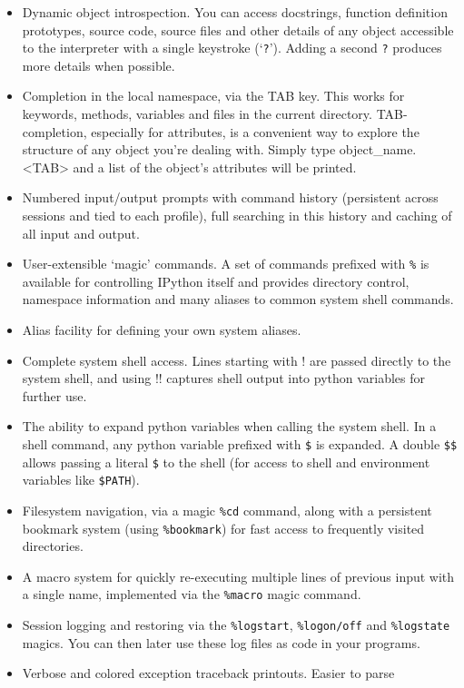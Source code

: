 \begin{itemize}
\item Dynamic object introspection. You can access docstrings, function
definition prototypes, source code, source files and other details
of any object accessible to the interpreter with a single keystroke
(`\texttt{?}'). Adding a second \texttt{?} produces more details when
possible.
\item Completion in the local namespace, via the TAB key. This works for
keywords, methods, variables and files in the current directory. TAB-completion,
especially for attributes, is a convenient way to explore the structure
of any object you're dealing with. Simply type object\_name.<TAB>
and a list of the object's attributes will be printed.
\item Numbered input/output prompts with command history (persistent across
sessions and tied to each profile), full searching in this history
and caching of all input and output.
\item User-extensible `magic' commands. A set of commands prefixed with
\texttt{\%} is available for controlling IPython itself and provides
directory control, namespace information and many aliases to common
system shell commands.
\item Alias facility for defining your own system aliases.
\item Complete system shell access. Lines starting with ! are passed directly
to the system shell, and using !! captures shell output into python
variables for further use.
\item The ability to expand python variables when calling the system shell.
In a shell command, any python variable prefixed with \texttt{\$}
is expanded. A double \texttt{\$\$} allows passing a literal \texttt{\$}
to the shell (for access to shell and environment variables like \texttt{\$PATH}).
\item Filesystem navigation, via a magic \texttt{\%cd} command, along with
a persistent bookmark system (using \texttt{\%bookmark}) for fast
access to frequently visited directories.
\item A macro system for quickly re-executing multiple lines of previous
input with a single name, implemented via the \texttt{\%macro} magic
command.
\item Session logging and restoring via the \texttt{\%logstart}, \texttt{\%logon/off}
and \texttt{\%logstate} magics. You can then later use these log files
as code in your programs.
\item Verbose and colored exception traceback printouts. Easier to parse

\end{itemize}
